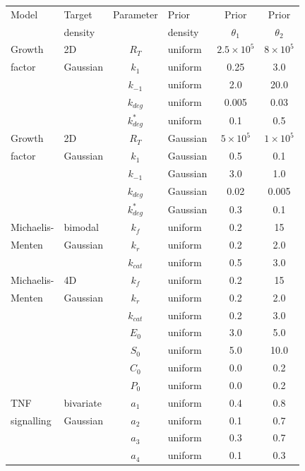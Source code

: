 \begin{table}[H]
\centering
\begin{adjustwidth}{0in}{0in}%
\begin{tabularx}{1.0\textwidth}{llclcc}
Model	& Target  & Parameter & Prior    & Prior  & Prior  \\
        & density &           & density  & $\theta_1$  & $\theta_2$  \\
\toprule
Growth  & 2D     & $R_T$       & uniform & $2.5 \times 10^5$ &  $8 \times 10^5$\\
factor  & Gaussian & $k_1$       & uniform & 0.25 & 3.0\\
                && $k_{-1}$    & uniform & 2.0 & 20.0\\
                && $k_{deg}$   & uniform & 0.005 & 0.03\\
                && $k^*_{deg}$ & uniform & 0.1 & 0.5\\
\toprule
Growth  & 2D     & $R_T$ & Gaussian & $5 \times 10^5$ &  $1 \times 10^5$\\
factor  & Gaussian & $k_1$ & Gaussian & 0.5 & 0.1\\
                && $k_{-1}$ & Gaussian & 3.0 & 1.0\\
                && $k_{deg}$ & Gaussian & 0.02 & 0.005\\
                && $k^*_{deg}$ & Gaussian & 0.3 & 0.1\\
\toprule
Michaelis- & bimodal  & $k_f$ & uniform & 0.2 &  15\\
Menten     & Gaussian   & $k_r$ & uniform & 0.2 & 2.0\\
&& $k_{cat}$ & uniform & 0.5 & 3.0\\
\toprule
Michaelis- & 4D    & $k_f$ & uniform & 0.2 &  15\\
Menten     & Gaussian& $k_r$ & uniform & 0.2 & 2.0\\
&& $k_{cat}$ & uniform & 0.2 & 3.0\\
&& $E_0$ & uniform & 3.0 & 5.0\\
&& $S_0$ & uniform & 5.0 & 10.0\\
&& $C_0$ & uniform & 0.0 & 0.2\\
&& $P_0$ & uniform & 0.0 & 0.2\\
\toprule
TNF & bivariate & $a_1$ & uniform & 0.4 & 0.8\\
signalling & Gaussian& $a_2$ & uniform & 0.1 & 0.7\\
&& $a_3$ & uniform & 0.3 & 0.7\\
&& $a_4$ & uniform & 0.1 & 0.3\\

\end{tabularx}
\end{adjustwidth}
\end{table}
